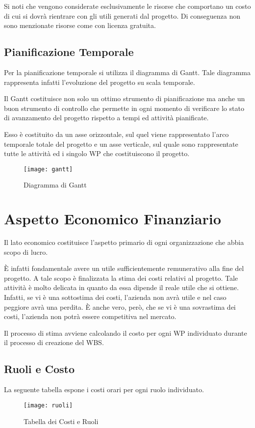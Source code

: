 Si noti che vengono considerate esclusivamente le risorse che comportano un costo di cui si dovrà rientrare con gli utili generati dal progetto. Di conseguenza non sono menzionate risorse come \sw con licenza gratuita.

\subsection{Pianificazione Temporale}
Per la pianificazione temporale si utilizza il diagramma di Gantt. Tale diagramma rappresenta infatti l'evoluzione del progetto su scala temporale.

Il Gantt costituisce non solo un ottimo strumento di pianificazione ma anche un buon strumento di controllo che permette in ogni momento di verificare lo stato di avanzamento del progetto rispetto a tempi ed attività pianificate.

Esso è costituito da un asse orizzontale, sul quel viene rappresentato l'arco temporale totale del progetto e un asse verticale, sul quale sono rappresentate tutte le attività ed i singolo WP che costituiscono il progetto.

\begin{figure}[!h]
  \texttt{[image: gantt]}	
  	\label{fig:gantt}
	\caption{Diagramma di Gantt}
\end{figure}

\clearpage

\section{Aspetto Economico Finanziario}
Il lato economico costituisce l'aspetto primario di ogni organizzazione che abbia scopo di lucro.

È infatti fondamentale avere un utile sufficientemente remunerativo alla fine del progetto. A tale scopo è finalizzata la stima dei costi relativi al progetto. Tale attività è molto delicata in quanto da essa dipende il reale utile che si ottiene. Infatti, se vi è una sottostima dei costi, l'azienda non avrà utile e nel caso peggiore avrà una perdita. È anche vero, però, che se vi è una sovrastima dei costi, l'azienda non potrà essere competitiva nel mercato.

Il processo di stima avviene calcolando il costo per ogni WP individuato durante il processo di creazione del WBS.

\subsection{Ruoli e Costo }
La seguente tabella espone i costi orari per ogni ruolo individuato.
\begin{figure}
  \centering
  \texttt{[image: ruoli]}	
  \label{fig:ruoli}
	\caption{Tabella dei Costi e Ruoli}
\end{figure}

